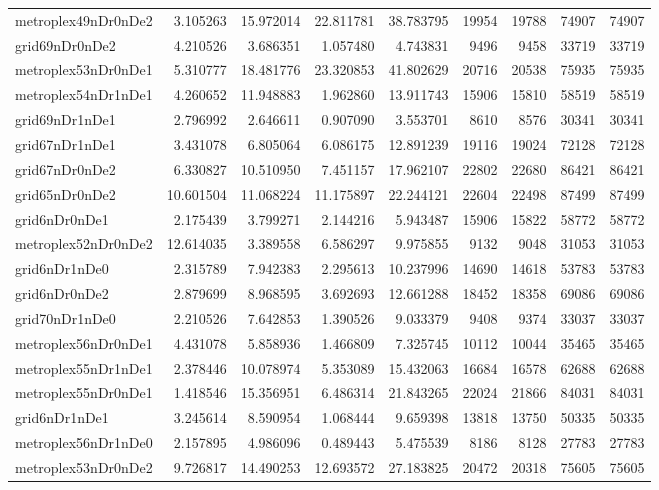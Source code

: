 \begin{longtable}{|l|r|r|r|r|r|r|r|r|}
metroplex49nDr0nDe2 & 3.105263 & 15.972014 & 22.811781 & 38.783795 & 19954 & 19788 & 74907 & 74907 \\
grid69nDr0nDe2 & 4.210526 & 3.686351 & 1.057480 & 4.743831 & 9496 & 9458 & 33719 & 33719 \\
metroplex53nDr0nDe1 & 5.310777 & 18.481776 & 23.320853 & 41.802629 & 20716 & 20538 & 75935 & 75935 \\
metroplex54nDr1nDe1 & 4.260652 & 11.948883 & 1.962860 & 13.911743 & 15906 & 15810 & 58519 & 58519 \\
grid69nDr1nDe1 & 2.796992 & 2.646611 & 0.907090 & 3.553701 & 8610 & 8576 & 30341 & 30341 \\
grid67nDr1nDe1 & 3.431078 & 6.805064 & 6.086175 & 12.891239 & 19116 & 19024 & 72128 & 72128 \\
grid67nDr0nDe2 & 6.330827 & 10.510950 & 7.451157 & 17.962107 & 22802 & 22680 & 86421 & 86421 \\
grid65nDr0nDe2 & 10.601504 & 11.068224 & 11.175897 & 22.244121 & 22604 & 22498 & 87499 & 87499 \\
grid6nDr0nDe1 & 2.175439 & 3.799271 & 2.144216 & 5.943487 & 15906 & 15822 & 58772 & 58772 \\
metroplex52nDr0nDe2 & 12.614035 & 3.389558 & 6.586297 & 9.975855 & 9132 & 9048 & 31053 & 31053 \\
grid6nDr1nDe0 & 2.315789 & 7.942383 & 2.295613 & 10.237996 & 14690 & 14618 & 53783 & 53783 \\
grid6nDr0nDe2 & 2.879699 & 8.968595 & 3.692693 & 12.661288 & 18452 & 18358 & 69086 & 69086 \\
grid70nDr1nDe0 & 2.210526 & 7.642853 & 1.390526 & 9.033379 & 9408 & 9374 & 33037 & 33037 \\
metroplex56nDr0nDe1 & 4.431078 & 5.858936 & 1.466809 & 7.325745 & 10112 & 10044 & 35465 & 35465 \\
metroplex55nDr1nDe1 & 2.378446 & 10.078974 & 5.353089 & 15.432063 & 16684 & 16578 & 62688 & 62688 \\
metroplex55nDr0nDe1 & 1.418546 & 15.356951 & 6.486314 & 21.843265 & 22024 & 21866 & 84031 & 84031 \\
grid6nDr1nDe1 & 3.245614 & 8.590954 & 1.068444 & 9.659398 & 13818 & 13750 & 50335 & 50335 \\
metroplex56nDr1nDe0 & 2.157895 & 4.986096 & 0.489443 & 5.475539 & 8186 & 8128 & 27783 & 27783 \\
metroplex53nDr0nDe2 & 9.726817 & 14.490253 & 12.693572 & 27.183825 & 20472 & 20318 & 75605 & 75605 \\

\end{longtable}
